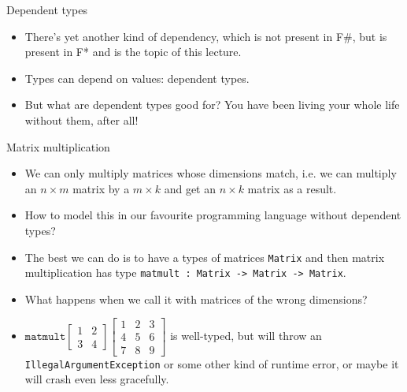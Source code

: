 \documentclass{beamer}
\newcommand{\m}[1]{\texttt{#1}}
\begin{document}
\begin{frame}{Dependent types}
\begin{itemize}
	\item There's yet another kind of dependency, which is not present in F\#, but is present in F* and is the topic of this lecture.
	\item Types can depend on values: dependent types.
	\item But what are dependent types good for? You have been living your whole life without them, after all!
\end{itemize}
\end{frame}

\begin{frame}{Matrix multiplication}
\begin{itemize}
	\item We can only multiply matrices whose dimensions match, i.e. we can multiply an $n \times m$ matrix by a $m \times k$ and get an $n \times k$ matrix as a result.
	\item How to model this in our favourite programming language without dependent types?
	\item The best we can do is to have a types of matrices \m{Matrix} and then matrix multiplication has type \m{matmult :\ Matrix -> Matrix -> Matrix}.
	\item What happens when we call it with matrices of the wrong dimensions?
	\item $\m{matmult} \begin{bmatrix}1 & 2\\3 & 4\end{bmatrix} \begin{bmatrix}1 & 2 & 3\\4 & 5 & 6\\7 & 8 & 9\end{bmatrix}$ is well-typed, but will throw an \m{IllegalArgumentException} or some other kind of runtime error, or maybe it will crash even less gracefully.
\end{itemize}
\end{frame}
\end{document}
